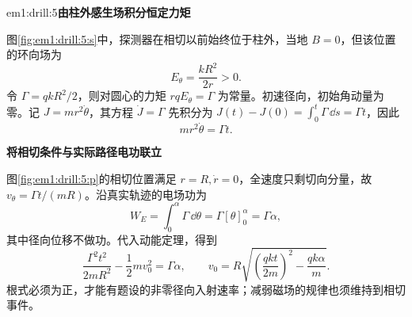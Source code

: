 \begin{drillsolution}{em1:drill:5}\textbf{由柱外感生场积分恒定力矩}\par\nobreak
图\ref{fig:em1:drill:5:s}中，探测器在相切以前始终位于柱外，当地 $B=0$，但该位置的环向场为
\[
E_\theta=\frac{kR^2}{2r}>0.
\]
令 $\Gamma=qkR^2/2$，则对圆心的力矩 $r qE_\theta=\Gamma$ 为常量。初速径向，初始角动量为零。记 $J=mr^2\dot\theta$，其方程 $\dot J=\Gamma$ 先积分为
$J(t)-J(0)=\int_0^t\Gamma\,\dd s=\Gamma t$，因此
\[
mr^2\dot\theta=\Gamma t.
\]


\par\medskip{}\noindent\textbf{将相切条件与实际路径电功联立}\par\nobreak
图\ref{fig:em1:drill:5:p}的相切位置满足 $r=R,\dot r=0$，全速度只剩切向分量，故 $v_\theta=\Gamma t/(mR)$。沿真实轨迹的电场功为
\[
W_E=\int_0^\alpha\Gamma\,\dd\theta
=\Gamma[\theta]_0^\alpha=\Gamma\alpha,
\]
其中径向位移不做功。代入动能定理，得到
\[
\frac{\Gamma^2t^2}{2mR^2}-\frac12mv_0^2=\Gamma\alpha,
\qquad
\boxed{v_0=R\sqrt{\left(\frac{qkt}{2m}\right)^2-\frac{qk\alpha}{m}}}.
\]
根式必须为正，才能有题设的非零径向入射速率；减弱磁场的规律也须维持到相切事件。




\end{drillsolution}
